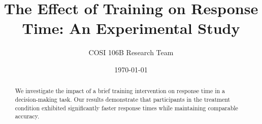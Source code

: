 \documentclass[12pt]{article}
\title{The Effect of Training on Response Time: An Experimental Study}
\author{COSI 106B Research Team}
\date{\today}
\begin{document}
\maketitle

\begin{abstract}
We investigate the impact of a brief training intervention on response time in a decision-making task. Our results demonstrate that participants in the treatment condition exhibited significantly faster response times while maintaining comparable accuracy.
\end{abstract}






\end{document}
